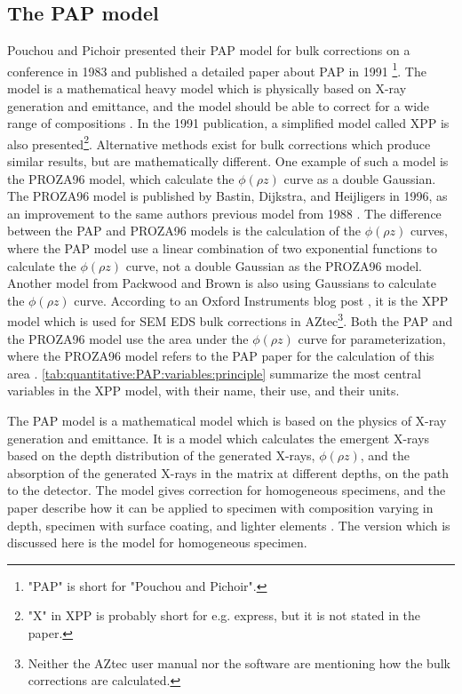 \subsection{The PAP model}
\label{theory:quantitative:pap}

Pouchou and Pichoir presented their PAP model for bulk corrections on a conference in 1983 and published a detailed paper about PAP in 1991 \cite{pap_1991}\footnote{"PAP" is short for "Pouchou and Pichoir".}.
The model is a mathematical heavy model which is physically based on X-ray generation and emittance, and the model should be able to correct for a wide range of compositions \cite{pap_1991}.
In the 1991 publication, a simplified model called XPP is also presented\footnote{"X" in XPP is probably short for e.g. express, but it is not stated in the paper.}.
Alternative methods exist for bulk corrections which produce similar results, but are mathematically different.
One example of such a model is the PROZA96 model, which calculate the $\phi(\rho z)$ curve as a double Gaussian.
The PROZA96 model is published by Bastin, Dijkstra, and Heijligers in 1996, as an improvement to the same authors previous model from 1988 \cite{bastin_proza96_1998,bastin_proza_1988}.
The difference between the PAP and PROZA96 models is the calculation of the $\phi(\rho z)$ curves, where the PAP model use a linear combination of two exponential functions to calculate the $\phi(\rho z)$ curve, not a double Gaussian as the PROZA96 model.
Another model from Packwood and Brown \cite{packwood_1981} is also using Gaussians to calculate the $\phi(\rho z)$ curve.
According to an Oxford Instruments blog post \cite{oxford_blog_XPP}, it is the XPP model which is used for SEM EDS bulk corrections in AZtec\footnote{Neither the AZtec user manual nor the software \cite{aztec_manual} are mentioning how the bulk corrections are calculated.}.
Both the PAP and the PROZA96 model use the area under the $\phi(\rho z)$ curve for parameterization, where the PROZA96 model refers to the PAP paper for the calculation of this area \cite{bastin_proza96_1998}.
\cref{tab:quantitative:PAP:variables:principle} summarize the most central variables in the XPP model, with their name, their use, and their units.



The PAP model is a mathematical model which is based on the physics of X-ray generation and emittance.
It is a model which calculates the emergent X-rays based on the depth distribution of the generated X-rays, $\phi(\rho z)$, and the absorption of the generated X-rays in the matrix at different depths, on the path to the detector.
The model gives correction for homogeneous specimens, and the paper describe how it can be applied to specimen with composition varying in depth, specimen with surface coating, and lighter elements \cite{pap_1991}.
The version which is discussed here is the model for homogeneous specimen.



